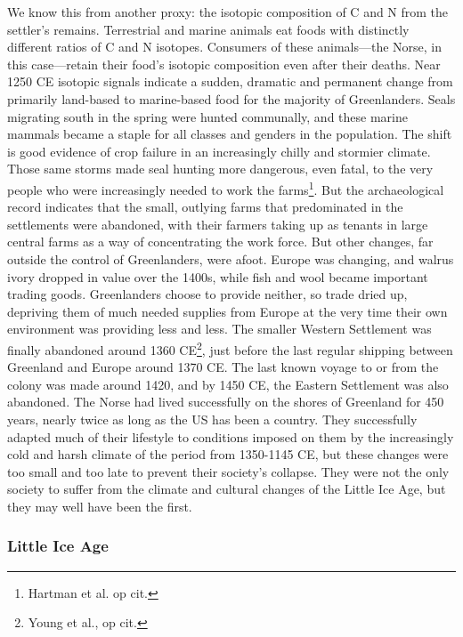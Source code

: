 \documentclass[amstex,12pt]{book}
\begin{document}
We know this from another proxy: the isotopic composition of C and N from the settler's remains. Terrestrial and marine animals eat foods with distinctly different ratios of C and N isotopes. Consumers of these animals---the Norse, in this case---retain their food's isotopic composition even after their deaths. Near 1250 CE isotopic signals indicate a sudden, dramatic and permanent change from primarily land-based to marine-based food for the majority of Greenlanders. Seals migrating south in the spring were hunted communally, and these marine mammals became a staple for all classes and genders in the population. The shift is good evidence of crop failure in an increasingly chilly and stormier climate. Those same storms made seal hunting more dangerous, even fatal, to the very people who were increasingly needed to work the farms\footnote{Hartman et al. op cit.}. But the archaeological record indicates that the small, outlying farms that predominated in the  settlements were abandoned, with their farmers taking up as tenants in large central farms as a way of concentrating the work force. But other changes, far outside the control of Greenlanders, were afoot. Europe was changing, and walrus ivory dropped in value over the 1400s, while fish and wool became important trading goods. Greenlanders choose to provide neither, so trade dried up, depriving them of much needed supplies from Europe at the very time their own environment was providing less and less. The smaller Western Settlement was finally abandoned around 1360 CE\footnote{Young et al., op cit.}, just before the last regular shipping between Greenland and Europe around 1370 CE. The last known voyage to or from the colony was made around 1420, and by 1450 CE, the Eastern Settlement was also abandoned. The Norse had lived successfully on the shores of Greenland for 450 years, nearly twice as long as the US has been a country. They successfully adapted much of their lifestyle to conditions imposed on them by the increasingly cold and harsh climate of the period from 1350-1145 CE, but these changes were too small and too late to prevent their society's collapse. They were not the only society to suffer from the climate and cultural changes of the Little Ice Age, but they may well have been the first.\\

\subsubsection{Little Ice Age}
\end{document}

